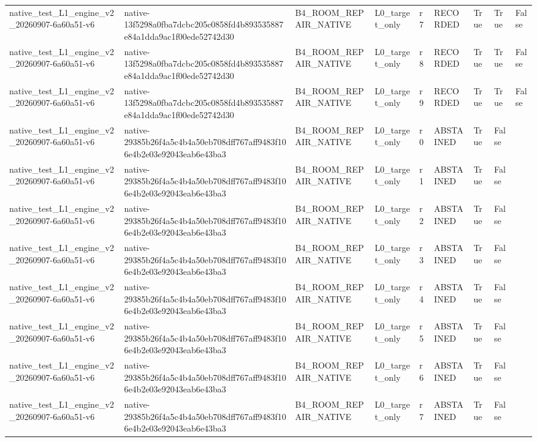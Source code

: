 \begin{tabular}{lllllllll}
native\_test\_L1\_engine\_v2\_20260907-6a60a51-v6 & native-13f5298a0fba7dcbc205c0858fd4b893535887e84a1dda9ac1f00ede52742d30 & B4\_ROOM\_REPAIR\_NATIVE & L0\_target\_only & r7 & RECORDED & True & True & False \\
native\_test\_L1\_engine\_v2\_20260907-6a60a51-v6 & native-13f5298a0fba7dcbc205c0858fd4b893535887e84a1dda9ac1f00ede52742d30 & B4\_ROOM\_REPAIR\_NATIVE & L0\_target\_only & r8 & RECORDED & True & True & False \\
native\_test\_L1\_engine\_v2\_20260907-6a60a51-v6 & native-13f5298a0fba7dcbc205c0858fd4b893535887e84a1dda9ac1f00ede52742d30 & B4\_ROOM\_REPAIR\_NATIVE & L0\_target\_only & r9 & RECORDED & True & True & False \\
native\_test\_L1\_engine\_v2\_20260907-6a60a51-v6 & native-29385b26f4a5c4b4a50eb708dff767aff9483f106e4b2e03e92043eab6e43ba3 & B4\_ROOM\_REPAIR\_NATIVE & L0\_target\_only & r0 & ABSTAINED & True & False &  \\
native\_test\_L1\_engine\_v2\_20260907-6a60a51-v6 & native-29385b26f4a5c4b4a50eb708dff767aff9483f106e4b2e03e92043eab6e43ba3 & B4\_ROOM\_REPAIR\_NATIVE & L0\_target\_only & r1 & ABSTAINED & True & False &  \\
native\_test\_L1\_engine\_v2\_20260907-6a60a51-v6 & native-29385b26f4a5c4b4a50eb708dff767aff9483f106e4b2e03e92043eab6e43ba3 & B4\_ROOM\_REPAIR\_NATIVE & L0\_target\_only & r2 & ABSTAINED & True & False &  \\
native\_test\_L1\_engine\_v2\_20260907-6a60a51-v6 & native-29385b26f4a5c4b4a50eb708dff767aff9483f106e4b2e03e92043eab6e43ba3 & B4\_ROOM\_REPAIR\_NATIVE & L0\_target\_only & r3 & ABSTAINED & True & False &  \\
native\_test\_L1\_engine\_v2\_20260907-6a60a51-v6 & native-29385b26f4a5c4b4a50eb708dff767aff9483f106e4b2e03e92043eab6e43ba3 & B4\_ROOM\_REPAIR\_NATIVE & L0\_target\_only & r4 & ABSTAINED & True & False &  \\
native\_test\_L1\_engine\_v2\_20260907-6a60a51-v6 & native-29385b26f4a5c4b4a50eb708dff767aff9483f106e4b2e03e92043eab6e43ba3 & B4\_ROOM\_REPAIR\_NATIVE & L0\_target\_only & r5 & ABSTAINED & True & False &  \\
native\_test\_L1\_engine\_v2\_20260907-6a60a51-v6 & native-29385b26f4a5c4b4a50eb708dff767aff9483f106e4b2e03e92043eab6e43ba3 & B4\_ROOM\_REPAIR\_NATIVE & L0\_target\_only & r6 & ABSTAINED & True & False &  \\
native\_test\_L1\_engine\_v2\_20260907-6a60a51-v6 & native-29385b26f4a5c4b4a50eb708dff767aff9483f106e4b2e03e92043eab6e43ba3 & B4\_ROOM\_REPAIR\_NATIVE & L0\_target\_only & r7 & ABSTAINED & True & False &  \\

\end{tabular}
